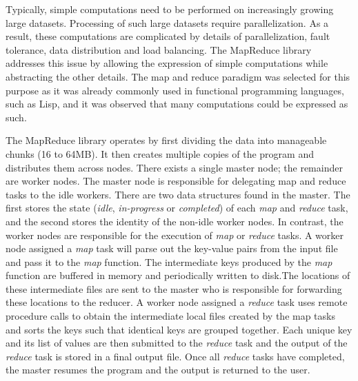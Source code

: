 \documentclass{report}
\begin{document}
        Typically, simple computations need to be performed on 
        increasingly growing large datasets. Processing of such 
        large datasets require parallelization. As a result, 
        these computations are complicated by details of 
        parallelization, fault tolerance, data distribution and 
        load balancing. The MapReduce library addresses this issue 
        by allowing the expression of simple computations while 
        abstracting the other details. The map and reduce paradigm 
        was selected for this purpose as it was already commonly 
        used in functional programming languages, such as Lisp, and 
        it was observed that many computations could be expressed 
        as such.

        The MapReduce library operates by first dividing the data 
        into manageable chunks (16 to 64MB). It then creates 
        multiple copies of the program and distributes them across
        nodes. There exists a single master node; the remainder are
        worker nodes. The master node is responsible for delegating 
        map and reduce tasks to the idle workers. There are two data
        structures found in the master. The first stores the state 
        (\textit{idle}, \textit{in-progress} or \textit{completed}) 
        of each \textit{map} and \textit{reduce} task, and the second
        stores the identity of the non-idle worker nodes. In contrast,
        the worker nodes are responsible for the execution of 
        \textit{map} or \textit{reduce} tasks. A worker node assigned
        a \textit{map} task will parse out the key-value pairs from 
        the input file and pass it to the \textit{map} function. The 
        intermediate keys produced by the \textit{map} function are 
        buffered in memory and periodically written to disk.The 
        locations of these intermediate files are sent to the master 
        who is responsible for forwarding these locations to the 
        reducer. A worker node assigned a \textit{reduce} task uses 
        remote procedure calls to obtain the intermediate local files
        created by the map tasks and sorts the keys such that identical
        keys are grouped together. Each unique key and its list of 
        values are then submitted to the \textit{reduce} task and the 
        output of the \textit{reduce} task is stored in a final output 
        file. Once all \textit{reduce} tasks have completed, the master
        resumes the program and the output is returned to the user.
\end{document}
